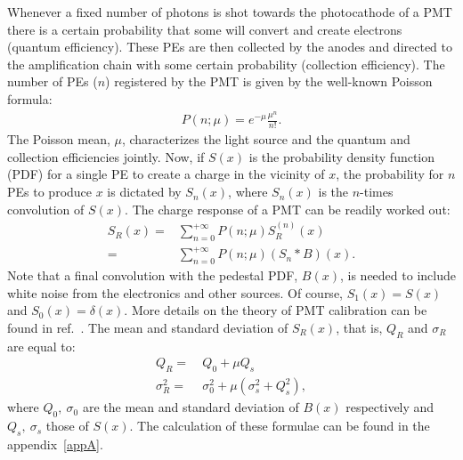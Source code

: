 \documentclass[a4paper,11pt]{article}
\begin{document}
Whenever a fixed number of photons is shot towards the photocathode of a PMT there is a certain probability that some will convert and create electrons (quantum efficiency). 
These PEs are then collected by the anodes and directed to the amplification chain with some certain probability (collection efficiency). 
The number of PEs ($n$) registered by the PMT is given by the well-known Poisson formula:
\begin{align}
P(n;\mu) = e^{-\mu}\frac{\mu^n}{n!}. \label{eq:poisson}
\end{align}
The Poisson mean, $\mu$, characterizes the light source and the quantum and collection efficiencies jointly. 
Now, if $S(x)$ is the probability density function (PDF) for a single PE to create a charge in the vicinity of $x$, 
the probability for $n$ PEs to produce $x$ is dictated by $S_n(x)$, where $S_n(x)$ is the $n$-times convolution of $S(x)$. 
The charge response of a PMT can be readily worked out:
\begin{align}
S_R(x) = &\sum_{n=0}^{+\infty} P(n;\mu)   S^{(n)}_R(x) \nonumber \\
            = & \sum_{n=0}^{+\infty} P(n;\mu) (S_n*B)(x). \label{eq:sr}
\end{align}
Note that a final convolution with the pedestal PDF, $B(x)$, is needed to include white noise from the electronics and other sources. 
Of course, $S_1(x)=S(x)$ and $S_0(x)=\delta(x)$. More details on the theory of PMT calibration can be found in ref.~\cite{me}.
The mean and standard deviation of $S_R(x)$, that is, $Q_R$ and $\sigma_R$ are equal to:
\begin{align}
Q_R  = & \ Q_0 + \mu Q_s \\
\sigma_R^2      = & \  \sigma_0^2 + \mu( \sigma_s^2 + Q_s^2 ),  
\end{align}
where $Q_0, \ \sigma_0$ are the mean and standard deviation of $B(x)$ respectively and $Q_s, \ \sigma_s$ those of $S(x)$.
The calculation of these formulae can be found in the appendix~\ref{appA}. 
\end{document}
